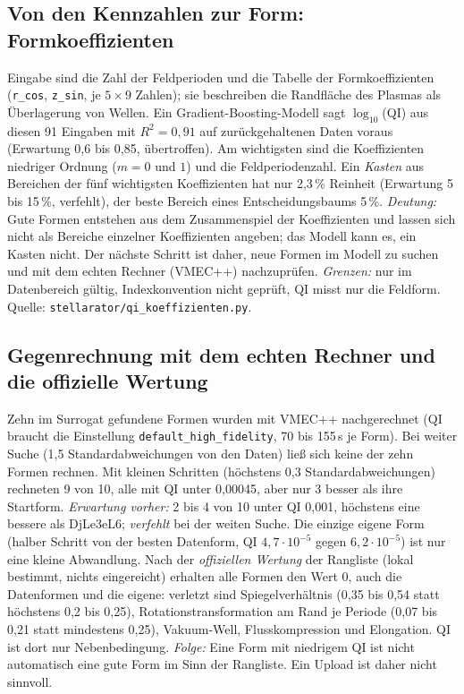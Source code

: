 \subsection*{Von den Kennzahlen zur Form: Formkoeffizienten}
Eingabe sind die Zahl der Feldperioden und die Tabelle der Formkoeffizienten (\texttt{r\_cos}, \texttt{z\_sin}, je $5\times9$ Zahlen); sie beschreiben die Randfläche des Plasmas
als Überlagerung von Wellen. Ein Gradient-Boosting-Modell sagt $\log_{10}$(QI) aus diesen 91 Eingaben mit $R^2=0{,}91$ auf zurückgehaltenen Daten voraus
(Erwartung 0,6 bis 0,85, übertroffen). Am wichtigsten sind die Koeffizienten niedriger Ordnung ($m=0$ und $1$) und die Feldperiodenzahl.
Ein \emph{Kasten} aus Bereichen der fünf wichtigsten Koeffizienten hat nur 2,3\,\% Reinheit (Erwartung 5 bis 15\,\%, verfehlt), der beste Bereich eines Entscheidungsbaums 5\,\%.
\emph{Deutung:} Gute Formen entstehen aus dem Zusammenspiel der Koeffizienten und lassen sich nicht als Bereiche einzelner Koeffizienten angeben; das Modell kann es, ein Kasten nicht.
Der nächste Schritt ist daher, neue Formen im Modell zu suchen und mit dem echten Rechner (VMEC++) nachzuprüfen.
\emph{Grenzen:} nur im Datenbereich gültig, Indexkonvention nicht geprüft, QI misst nur die Feldform. Quelle: \texttt{stellarator/qi\_koeffizienten.py}.

\subsection*{Gegenrechnung mit dem echten Rechner und die offizielle Wertung}
Zehn im Surrogat gefundene Formen wurden mit VMEC++ nachgerechnet (QI braucht die Einstellung \texttt{default\_high\_fidelity}, 70 bis 155\,s je Form). Bei weiter Suche (1,5 Standardabweichungen von den Daten) ließ sich keine der zehn Formen rechnen. Mit kleinen Schritten (höchstens 0,3 Standardabweichungen) rechneten 9 von 10, alle mit QI unter 0,00045, aber nur 3 besser als ihre Startform.
\emph{Erwartung vorher:} 2 bis 4 von 10 unter QI 0,001, höchstens eine bessere als DjLe3eL6; \emph{verfehlt} bei der weiten Suche. Die einzige eigene Form (halber Schritt von der besten Datenform, QI $4{,}7\cdot10^{-5}$ gegen $6{,}2\cdot10^{-5}$) ist nur eine kleine Abwandlung.
Nach der \emph{offiziellen Wertung} der Rangliste (lokal bestimmt, nichts eingereicht) erhalten alle Formen den Wert 0, auch die Datenformen und die eigene: verletzt sind Spiegelverhältnis (0,35 bis 0,54 statt höchstens 0,2 bis 0,25), Rotationstransformation am Rand je Periode (0,07 bis 0,21 statt mindestens 0,25), Vakuum-Well, Flusskompression und Elongation. QI ist dort nur Nebenbedingung.
\emph{Folge:} Eine Form mit niedrigem QI ist nicht automatisch eine gute Form im Sinn der Rangliste. Ein Upload ist daher nicht sinnvoll.
